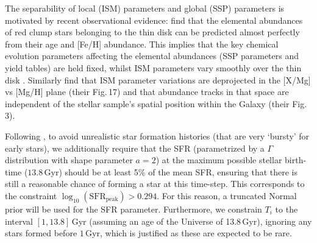 \documentclass{aa}
\begin{document}
The separability of local (ISM) parameters and global (SSP) parameters is motivated by recent observational evidence: \citet{2019arXiv190710606N} find that the elemental abundances of red clump stars belonging to the thin disk can be predicted almost perfectly from their age and [Fe/H] abundance. This implies that the key chemical evolution parameters affecting the elemental abundances (SSP parameters and yield tables) are held fixed, whilst ISM parameters vary smoothly over the thin disk \citep[which offsets the metallicity for different galactocentric radii, e.g.][for a simulated example]{Buck2020, Wang2024}. Similarly \cite{2019ApJ...874..102W} find that ISM parameter variations are deprojected in the [X/Mg] vs [Mg/H] plane (their Fig.\,17) and that abundance tracks in that space are independent of the stellar sample's spatial position within the Galaxy (their Fig.\,3).

Following \citet{Philcox_2019}, to avoid unrealistic star formation histories (that are very `bursty' for early stars), we additionally require that the SFR (parametrized by a $\Gamma$ distribution with shape parameter $a=2$) at the maximum possible stellar birth-time ($13.8$\,Gyr) should be at least 5\% of the mean SFR, ensuring that there is still a reasonable chance of forming a star at this time-step. This corresponds to the constraint $\log_{10}\left(\mathrm{SFR}_\mathrm{peak}\right)>0.294$. For this reason, a truncated Normal prior will be used for the SFR parameter. Furthermore, we constrain $T_i$ to the interval $[1,13.8]$\,Gyr (assuming an age of the Universe of 13.8\,Gyr), ignoring any stars formed before $1$\,Gyr, which is justified as these are expected to be rare.
\end{document}
